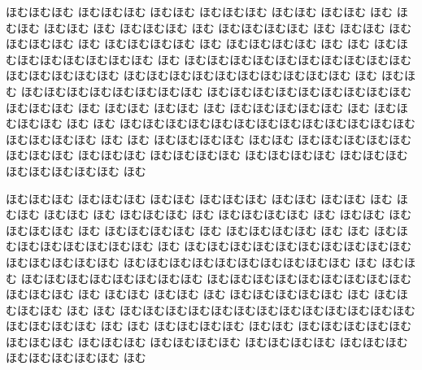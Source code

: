 \documentclass[a4paper]{article}
\begin{document}
\begin{exechomuhomu}
ほむほむほむ ほむほむほむ ほむほむ ほむほむほむ ほむほむ ほむほむ ほむ
ほむほむ ほむほむ ほむ ほむほむほむ ほむ ほむほむほむほむ ほむ
 ほむほむ ほむ ほむほむほむ ほむ ほむほむほむほむ ほむ ほむほむほむほむ ほむ
 ほむ ほむほむほむほむほむほむほむほむ ほむ ほむほむほむほむほむほむほむほむほむほむ
 ほむほむほむほむほむ ほむほむほむほむほむほむほむほむほむほむ ほむ ほむほむ
 ほむほむほむほむほむほむほむほむ ほむほむほむほむほむほむほむほむほむほむほむほむ
 ほむ ほむほむ ほむほむ ほむ ほむほむほむほむほむ ほむ ほむほむほむほむ ほむ
ほむ ほむほむほむほむほむほむほむほむほむほむほむほむほむほむほむほむほむ ほむ
 ほむ ほむほむほむほむ ほむほむ ほむほむほむほむほむほむほむほむ
 ほむほむほむ ほむほむほむほむ ほむほむほむほむ ほむほむほむほむほむほむほむほむ
ほむ
\end{exechomuhomu}

{\ttfamily\begin{exechomuhomu*}
ほむほむほむ ほむほむほむ ほむほむ ほむほむほむ ほむほむ ほむほむ ほむ
ほむほむ ほむほむ ほむ ほむほむほむ ほむ ほむほむほむほむ ほむ
 ほむほむ ほむ ほむほむほむ ほむ ほむほむほむほむ ほむ ほむほむほむほむ ほむ
 ほむ ほむほむほむほむほむほむほむほむ ほむ ほむほむほむほむほむほむほむほむほむほむ
 ほむほむほむほむほむ ほむほむほむほむほむほむほむほむほむほむ ほむ ほむほむ
 ほむほむほむほむほむほむほむほむ ほむほむほむほむほむほむほむほむほむほむほむほむ
 ほむ ほむほむ ほむほむ ほむ ほむほむほむほむほむ ほむ ほむほむほむほむ ほむ
ほむ ほむほむほむほむほむほむほむほむほむほむほむほむほむほむほむほむほむ ほむ
 ほむ ほむほむほむほむ ほむほむ ほむほむほむほむほむほむほむほむ
 ほむほむほむ ほむほむほむほむ ほむほむほむほむ ほむほむほむほむほむほむほむほむ
ほむ
\end{exechomuhomu*}}
\end{document}
